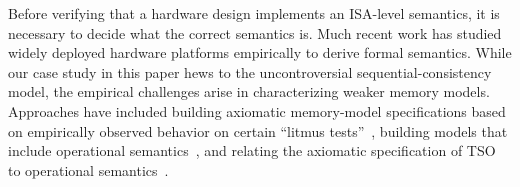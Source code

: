 
Before verifying that a hardware design implements an ISA-level semantics, it
is necessary to decide what the correct semantics is.  Much recent work has
studied widely deployed hardware platforms empirically to derive formal
semantics.  While our case study in this paper hews to the uncontroversial
sequential-consistency model, the empirical challenges arise in characterizing
weaker memory models.  Approaches have included building axiomatic
memory-model specifications based on empirically observed behavior on
certain ``litmus
tests''~\cite{Alglave11,Alglave:FMSD,alglave2012formal,Alglave:2010,Alglave:TACAS,alglave2014herding},
building models that include operational semantics~\cite{mador2012axiomatic,sarkar2011understanding,sarkar2012synchronising}, and relating the axiomatic specification of
TSO to operational semantics~\cite{x86tsocacm10}.


%

